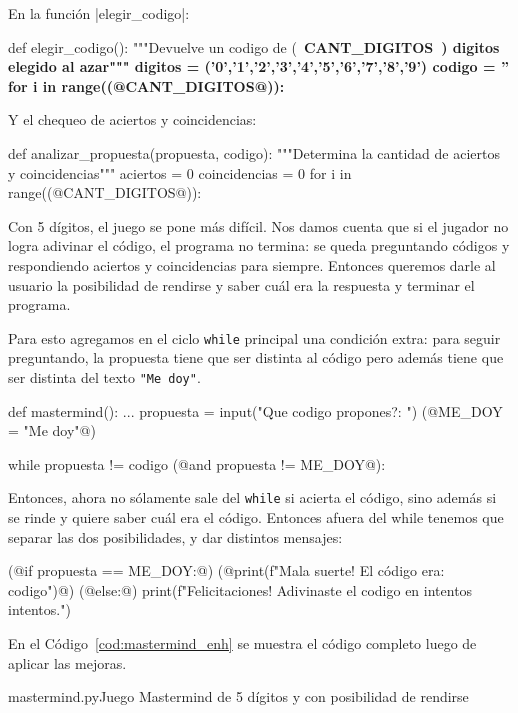 \begin{enumerate}
En la función |elegir_codigo|:

\begin{codigo-python-sn}
def elegir_codigo():
    """Devuelve un codigo de (~\bfseries{CANT\_DIGITOS}~) digitos elegido al azar"""
    digitos = ('0','1','2','3','4','5','6','7','8','9')
    codigo = ''
    for i in range((@CANT_DIGITOS@)):
\end{codigo-python-sn}

Y el chequeo de aciertos y coincidencias:

\begin{codigo-python-sn}
def analizar_propuesta(propuesta, codigo):
    """Determina la cantidad de aciertos y coincidencias"""
    aciertos = 0
    coincidencias = 0
    for i in range((@CANT_DIGITOS@)):
\end{codigo-python-sn}

Con 5 dígitos, el juego se pone más difícil. Nos damos cuenta que si el jugador
no logra adivinar el código, el programa no termina: se queda preguntando
códigos y respondiendo aciertos y coincidencias para siempre. Entonces queremos
darle al usuario la posibilidad de rendirse y saber cuál era la respuesta y
terminar el programa.

Para esto agregamos en el ciclo \lstinline!while! principal una condición
extra: para seguir preguntando, la propuesta tiene que ser distinta al
código pero además tiene que ser distinta del texto \lstinline!"Me doy"!.

\begin{codigo-python-sn}
def mastermind():
    ...
    propuesta = input("Que codigo propones?: ")
    (@ME_DOY = "Me doy"@)

    while propuesta != codigo (@and propuesta != ME_DOY@):
\end{codigo-python-sn}

Entonces, ahora no sólamente sale del \lstinline!while! si acierta el
código, sino además si se rinde y quiere saber cuál era el código. Entonces
afuera del while tenemos que separar las dos posibilidades, y dar distintos
mensajes:

\begin{codigo-python-sn}
    (@if propuesta == ME_DOY:@)
        (@print(f"Mala suerte! El código era: {codigo}")@)
    (@else:@)
        print(f"Felicitaciones! Adivinaste el codigo en {intentos} intentos.")
\end{codigo-python-sn}

En el Código~\ref{cod:mastermind_enh} se muestra el código completo luego de
aplicar las mejoras.

\begin{codigo}{\label{cod:mastermind_enh} mastermind.py}{Juego Mastermind de 5
    dígitos y con posibilidad de rendirse}

\end{codigo}
\end{enumerate}

